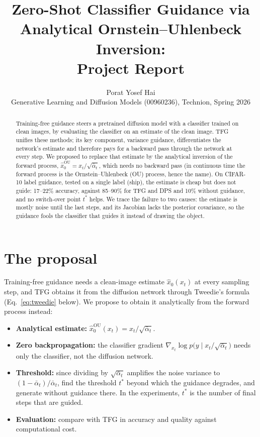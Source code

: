 \documentclass[11pt]{article}
\title{Zero-Shot Classifier Guidance via Analytical Ornstein--Uhlenbeck Inversion:\\ Project Report}
\author{Porat Yosef Hai\\[2pt] \small Generative Learning and Diffusion Models (00960236), Technion, Spring 2026}
\date{}
\newcommand{\xou}{\hat x_0^{\mathrm{OU}}}
\begin{document}
\maketitle

\begin{abstract}
Training-free guidance steers a pretrained diffusion model with a classifier trained on clean images, by evaluating
the classifier on an estimate of the clean image. TFG~\cite{tfg} unifies these methods; its key component, variance
guidance, differentiates the network's estimate and therefore pays for a backward pass through the network at every
step. We proposed to replace that estimate by the analytical inversion of the forward process,
$\xou = x_t/\sqrt{\bar\alpha_t}$, which needs no backward pass (in continuous time the forward process is the
Ornstein--Uhlenbeck (OU) process, hence the name). On CIFAR-10 label guidance, tested on a single label
(ship), the estimate is cheap but does not guide: 17--22\% accuracy, against 85--90\% for TFG and DPS and 10\% without guidance, and no switch-over point $t^*$
helps. We trace the failure to two causes: the estimate is mostly noise until the last steps, and its Jacobian lacks
the posterior covariance, so the guidance fools the classifier that guides it instead of drawing the object.
\end{abstract}

\section{The proposal}
Training-free guidance needs a clean-image estimate $\hat x_0(x_t)$ at every sampling step, and TFG obtains it from
the diffusion network through Tweedie's formula (Eq.~\eqref{eq:tweedie} below). We propose to obtain it analytically
from the forward process instead:
\begin{itemize}
  \item \textbf{Analytical estimate:} $\xou(x_t) = x_t/\sqrt{\bar\alpha_t}$.
  \item \textbf{Zero backpropagation:} the classifier gradient $\nabla_{x_t}\log p\big(y \mid x_t/\sqrt{\bar\alpha_t}\big)$
        needs only the classifier, not the diffusion network.
  \item \textbf{Threshold:} since dividing by $\sqrt{\bar\alpha_t}$ amplifies the noise variance to
        $(1-\bar\alpha_t)/\bar\alpha_t$, find the threshold $t^*$ beyond which the guidance degrades, and generate
        without guidance there. In the experiments, $t^*$ is the number of final steps that are guided.
  \item \textbf{Evaluation:} compare with TFG in accuracy and quality against computational cost.
\end{itemize}
\end{document}
